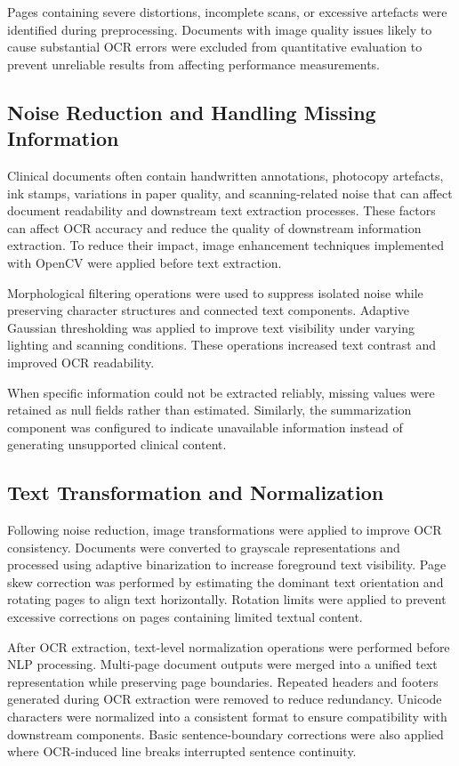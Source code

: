 Pages containing severe distortions, incomplete scans, or excessive artefacts were identified during preprocessing. Documents with image quality issues likely to cause substantial OCR errors were excluded from quantitative evaluation to prevent unreliable results from affecting performance measurements.

\subsection{Noise Reduction and Handling Missing Information}

Clinical documents often contain handwritten annotations, photocopy artefacts, ink stamps, variations in paper quality, and scanning-related noise that can affect document readability and downstream text extraction processes. These factors can affect OCR accuracy and reduce the quality of downstream information extraction. To reduce their impact, image enhancement techniques implemented with OpenCV were applied before text extraction.

Morphological filtering operations were used to suppress isolated noise while preserving character structures and connected text components. Adaptive Gaussian thresholding was applied to improve text visibility under varying lighting and scanning conditions. These operations increased text contrast and improved OCR readability.

When specific information could not be extracted reliably, missing values were retained as null fields rather than estimated. Similarly, the summarization component was configured to indicate unavailable information instead of generating unsupported clinical content.

\subsection{Text Transformation and Normalization}

Following noise reduction, image transformations were applied to improve OCR consistency. Documents were converted to grayscale representations and processed using adaptive binarization to increase foreground text visibility. Page skew correction was performed by estimating the dominant text orientation and rotating pages to align text horizontally. Rotation limits were applied to prevent excessive corrections on pages containing limited textual content.

After OCR extraction, text-level normalization operations were performed before NLP processing. Multi-page document outputs were merged into a unified text representation while preserving page boundaries. Repeated headers and footers generated during OCR extraction were removed to reduce redundancy. Unicode characters were normalized into a consistent format to ensure compatibility with downstream components. Basic sentence-boundary corrections were also applied where OCR-induced line breaks interrupted sentence continuity.

